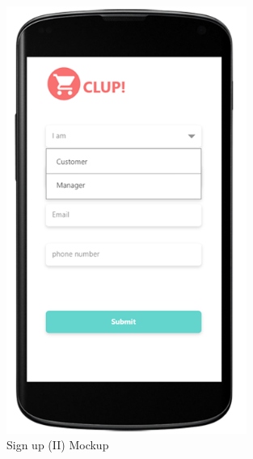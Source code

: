\begin{figure}[H]
  \centering
  \includegraphics[width=0.7\textwidth,keepaspectratio]{images/8.png}
  \caption{Sign up (II) Mockup}
\end{figure}
